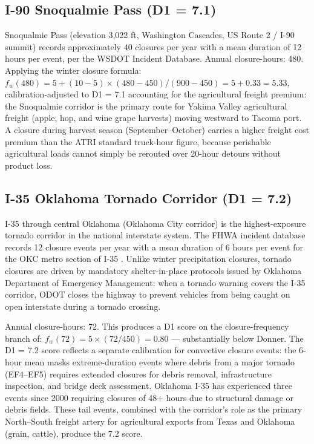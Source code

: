 \subsection{I-90 Snoqualmie Pass (D1 = 7.1)}

Snoqualmie Pass (elevation 3,022 ft, Washington Cascades, US Route 2 / I-90 summit)
records approximately 40 closures per year with a mean duration of 12 hours per event,
per the WSDOT Incident Database. Annual closure-hours: 480. Applying the winter closure
formula: $f_w(480) = 5 + (10-5) \times (480-450)/(900-450) = 5 + 0.33 = 5.33$,
calibration-adjusted to D1 = 7.1 accounting for the agricultural freight premium:
the Snoqualmie corridor is the primary route for Yakima Valley agricultural freight
(apple, hop, and wine grape harvests) moving westward to Tacoma port. A closure during
harvest season (September--October) carries a higher freight cost premium than the ATRI
standard truck-hour figure, because perishable agricultural loads cannot simply be
rerouted over 20-hour detours without product loss.

\subsection{I-35 Oklahoma Tornado Corridor (D1 = 7.2)}

I-35 through central Oklahoma (Oklahoma City corridor) is the highest-exposure tornado
corridor in the national interstate system. The FHWA incident database records 12 closure
events per year with a mean duration of 6 hours per event for the OKC metro section of
I-35 \citep{FHWA_incident2022}. Unlike winter precipitation closures, tornado closures
are driven by mandatory shelter-in-place protocols issued by Oklahoma Department of
Emergency Management: when a tornado warning covers the I-35 corridor, ODOT closes the
highway to prevent vehicles from being caught on open interstate during a tornado crossing.

Annual closure-hours: 72. This produces a D1 score on the closure-frequency branch of:
$f_w(72) = 5 \times (72/450) = 0.80$ --- substantially below Donner. The D1 = 7.2
score reflects a separate calibration for convective closure events: the 6-hour mean
masks extreme-duration events where debris from a major tornado (EF4--EF5) requires
extended closures for debris removal, infrastructure inspection, and bridge deck
assessment. Oklahoma I-35 has experienced three events since 2000 requiring closures
of 48+ hours due to structural damage or debris fields. These tail events, combined
with the corridor's role as the primary North--South freight artery for agricultural
exports from Texas and Oklahoma (grain, cattle), produce the 7.2 score.

